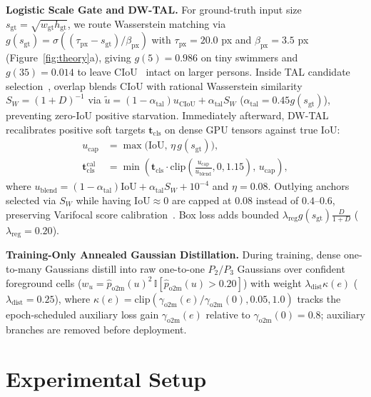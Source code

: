 \documentclass[10pt,twocolumn,letterpaper]{article}
\begin{document}
\textbf{Logistic Scale Gate and DW-TAL.} For ground-truth input size $s_{\mathrm{gt}} = \sqrt{w_{\mathrm{gt}} h_{\mathrm{gt}}}$, we route Wasserstein matching via $g(s_{\mathrm{gt}}) = \sigma((\tau_{\mathrm{px}} - s_{\mathrm{gt}})/\beta_{\mathrm{px}})$ with $\tau_{\mathrm{px}} = 20.0$ px and $\beta_{\mathrm{px}} = 3.5$ px (Figure~\ref{fig:theory}a), giving $g(5)=0.986$ on tiny swimmers and $g(35)=0.014$ to leave CIoU~\cite{zheng2020diou} intact on larger persons. Inside TAL candidate selection~\cite{feng2021tood}, overlap blends CIoU with rational Wasserstein similarity $S_W = (1 + D)^{-1}$ via $\tilde{u} = (1 - \alpha_{\mathrm{tal}}) u_{\mathrm{CIoU}} + \alpha_{\mathrm{tal}} S_W$ ($\alpha_{\mathrm{tal}} = 0.45 g(s_{\mathrm{gt}})$), preventing zero-IoU positive starvation. Immediately afterward, DW-TAL recalibrates positive soft targets $\mathbf{t}_{\mathrm{cls}}$ on dense GPU tensors against true $\mathrm{IoU}$:
\begin{align}
  u_{\mathrm{cap}} &= \max\!\big(\mathrm{IoU},\, \eta\,g(s_{\mathrm{gt}})\big), \nonumber\\
  \mathbf{t}_{\mathrm{cls}}^{\mathrm{cal}} &= \min\!\left(\mathbf{t}_{\mathrm{cls}} \cdot \mathrm{clip}\!\left(\frac{u_{\mathrm{cap}}}{u_{\mathrm{blend}}}, 0, 1.15\right),\, u_{\mathrm{cap}}\right),
  \label{eq:dwtal}
\end{align}
where $u_{\mathrm{blend}} = (1 - \alpha_{\mathrm{tal}})\mathrm{IoU} + \alpha_{\mathrm{tal}} S_W + 10^{-4}$ and $\eta = 0.08$. Outlying anchors selected via $S_W$ while having $\mathrm{IoU} \approx 0$ are capped at $0.08$ instead of $0.4\text{--}0.6$, preserving Varifocal score calibration~\cite{zhang2021varifocalnet}. Box loss adds bounded $\lambda_{\mathrm{reg}} g(s_{\mathrm{gt}}) \frac{D}{1 + D}$ ($\lambda_{\mathrm{reg}}=0.20$).

\textbf{Training-Only Annealed Gaussian Distillation.} During training, dense one-to-many Gaussians distill into raw one-to-one $P_2/P_3$ Gaussians over confident foreground cells ($w_u = \hat{p}_{\mathrm{o2m}}(u)^2\,\mathbb{I}[\hat{p}_{\mathrm{o2m}}(u) > 0.20]$) with weight $\lambda_{\mathrm{dist}} \kappa(e)$ ($\lambda_{\mathrm{dist}}=0.25$), where $\kappa(e) = \mathrm{clip}(\gamma_{\mathrm{o2m}}(e)/\gamma_{\mathrm{o2m}}(0), 0.05, 1.0)$ tracks the epoch-scheduled auxiliary loss gain $\gamma_{\mathrm{o2m}}(e)$ relative to $\gamma_{\mathrm{o2m}}(0)=0.8$; auxiliary branches are removed before deployment.

\section{Experimental Setup}
\label{sec:setup}
\end{document}
